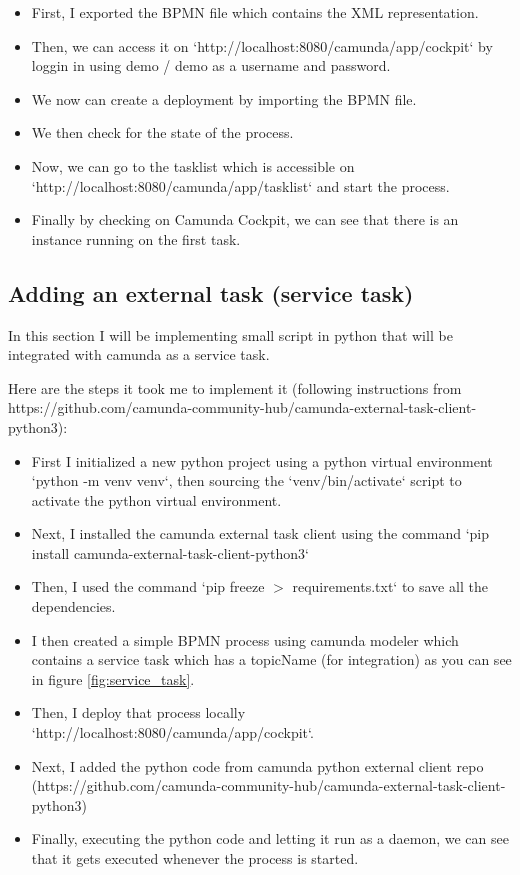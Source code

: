 \documentclass[12pt]{article}
\begin{document}
{  \begin{itemize}
    \item First, I exported the BPMN file which contains the XML representation.
    \item Then, we can access it on `http://localhost:8080/camunda/app/cockpit` by loggin in using demo / demo as a username and password.
    \item We now can create a deployment by importing the BPMN file.
    \item We then check for the state of the process.
    \item Now, we can go to the tasklist which is accessible on `http://localhost:8080/camunda/app/tasklist` and start the process.
    \item Finally by checking on Camunda Cockpit, we can see that there is an instance running on the first task.
  \end{itemize}

  \subsection{Adding an external task (service task)}

  In this section I will be implementing small script in python that will be integrated with camunda as a service task.

  Here are the steps it took me to implement it (following instructions from https://github.com/camunda-community-hub/camunda-external-task-client-python3):

  \begin{itemize}
    \item First I initialized a new python project using a python virtual environment `python -m venv venv`, then sourcing the `venv/bin/activate` script to activate the python virtual environment.
    \item Next, I installed the camunda external task client using the command `pip install camunda-external-task-client-python3`
    \item Then, I used the command `pip freeze $ > $ requirements.txt` to save all the dependencies.
    \item I then created a simple BPMN process using camunda modeler which contains a service task which has a topicName (for integration) as you can see in figure \ref{fig:service_task}.
    \item Then, I deploy that process locally `http://localhost:8080/camunda/app/cockpit`.
    \item Next, I added the python code from camunda python external client repo (https://github.com/camunda-community-hub/camunda-external-task-client-python3)
    \item Finally, executing the python code and letting it run as a daemon, we can see that it gets executed whenever the process is started.
  \end{itemize}

}
\end{document}

